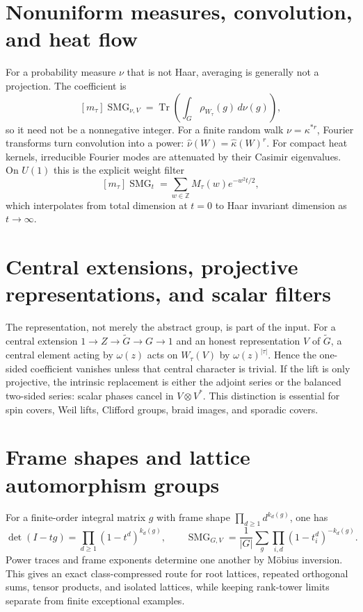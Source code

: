 \documentclass[10pt]{article}
\newcommand{\Tr}{\operatorname{Tr}}
\newcommand{\SMG}{\operatorname{SMG}}
\newcommand{\MGF}{\SMG}
\begin{document}
\section{Nonuniform measures, convolution, and heat flow}

For a probability measure $\nu$ that is not Haar, averaging is generally not
a projection.  The coefficient is
\[
[m_\tau]\MGF_{\nu,V}
=\Tr\!\left(\int_G\rho_{W_\tau}(g)\,d\nu(g)\right),
\]
so it need not be a nonnegative integer.  For a finite random walk
$\nu=\kappa^{*r}$, Fourier transforms turn convolution into a power:
$\widehat\nu(W)=\widehat\kappa(W)^r$.  For compact heat kernels, irreducible
Fourier modes are attenuated by their Casimir eigenvalues.  On $U(1)$ this is
the explicit weight filter
\[
[m_\tau]\MGF_t=\sum_{w\in\mathbb Z}M_\tau(w)e^{-w^2t/2},
\]
which interpolates from total dimension at $t=0$ to Haar invariant dimension
as $t\to\infty$.

\section{Central extensions, projective representations, and scalar filters}

The representation, not merely the abstract group, is part of the input.
For a central extension $1\to Z\to\widetilde G\to G\to1$ and an honest
representation $V$ of $\widetilde G$, a central element acting by
$\omega(z)$ acts on $W_\tau(V)$ by $\omega(z)^{|\tau|}$.  Hence the one-sided
coefficient vanishes unless that central character is trivial.  If the lift
is only projective, the intrinsic replacement is either the adjoint series or
the balanced two-sided series: scalar phases cancel in
$V\otimes V^*$.  This distinction is essential for spin covers, Weil lifts,
Clifford groups, braid images, and sporadic covers.

\section{Frame shapes and lattice automorphism groups}

For a finite-order integral matrix $g$ with frame shape
$\prod_{d\ge1}d^{k_d(g)}$, one has
\[
 \det(I-tg)=\prod_{d\ge1}(1-t^d)^{k_d(g)},\qquad
 \MGF_{G,V}=\frac1{|G|}\sum_g\prod_{i,d}(1-t_i^d)^{-k_d(g)}.
\]
Power traces and frame exponents determine one another by M\"obius inversion.
This gives an exact class-compressed route for root lattices, repeated
orthogonal sums, tensor products, and isolated lattices, while keeping
rank-tower limits separate from finite exceptional examples.
\end{document}
